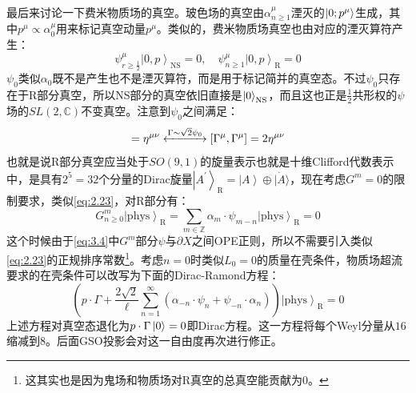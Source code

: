 最后来讨论一下费米物质场的真空。玻色场的真空由$\alpha^\mu_{n\geq 1}$湮灭的$\ket{0;p^\mu}$生成，其中$p^\mu\propto\alpha^\mu_0$用来标记真空动量$p^\mu$。类似的，费米物质场真空也由对应的湮灭算符产生：
\begin{equation}
	\psi_{r\geq\frac12}^\mu\left|0,p\right\rangle_{\mathrm{NS}}=0,\quad \psi_{n\geq1}^\mu\left|0,p\right\rangle_{\mathrm{R}}=0
\end{equation}
$\psi_0$类似$\alpha_0$既不是产生也不是湮灭算符，而是用于标记简并的真空态。不过$\psi_0$只存在于R部分真空，所以NS部分的真空依旧直接是$\ket{0}_{\mathrm{NS}}$，而且这也正是$\frac12$共形权的$\psi$场的$SL(2,\mathbb{C})$不变真空。注意到$\psi_0$之间满足：
\begin{equation}
	[\psi_0^\mu,\psi_0^\nu]=\eta^{\mu\nu}
	\xleftrightarrow{\Gamma\sim\sqrt{2}\psi_0} [\Gamma^\mu,\Gamma^\mu]=2\eta^{\mu\nu}
\end{equation}
也就是说R部分真空应当处于$SO(9,1)$的旋量表示也就是十维Clifford代数表示中，是具有$2^5=32$个分量的Dirac旋量$\left|A^{\prime}\right\rangle_{\mathrm{R}}=\left|A\right\rangle\oplus|\dot A\rangle$，现在考虑$G^m=0$的限制要求，类似\ref{eq:2.23}，对R部分有：
\begin{equation}
	G^m_{n\geq0}\left|\mathrm{phys}\right\rangle_{\mathrm{R}}=\sum_{m\in\mathbb{Z}}\alpha_m\cdot\psi_{m-n}\left|\mathrm{phys}\right\rangle_{\mathrm{R}}=0
\end{equation}
这个时候由于\ref{eq:3.4}中$G^m$部分$\psi$与$\partial X$之间OPE正则，所以不需要引入类似\ref{eq:2.23}的正规排序常数\footnote{这其实也是因为鬼场和物质场对R真空的总真空能贡献为0。}。考虑$n=0$时类似$L_0=0$的质量在壳条件，物质场超流要求的在壳条件可以改写为下面的Dirac-Ramond方程：
\begin{equation}
	\left(p\cdot\Gamma+\frac{2\sqrt{2}}{\ell}\sum_{n=1}^\infty(\alpha_{-n}\cdot \psi_n+\psi_{-n}\cdot\alpha_n)\right)\left|\mathrm{phys}\right\rangle_{\mathrm{R}}=0
\end{equation}
上述方程对真空态退化为$p\cdot\Gamma\ket{0}=0$即Dirac方程。这一方程将每个Weyl分量从$16$缩减到$8$。后面GSO投影会对这一自由度再次进行修正。

